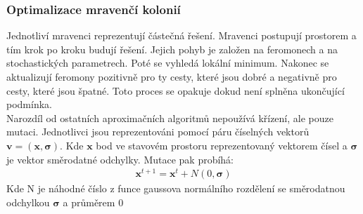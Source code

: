 \subsubsection{Optimalizace mravenčí kolonií}
Jednotliví mravenci reprezentují částečná řešení. Mravenci postupují prostorem a tím krok po kroku budují řešení. Jejich pohyb je založen na feromonech a na 
stochastických parametrech. Poté se vyhledá lokální minimum. Nakonec se aktualizují feromony pozitivně pro ty cesty, které jsou dobré a negativně pro cesty, které
jsou špatné. Toto proces se opakuje dokud není splněna ukončující podmínka.\\
Narozdíl od ostatních aproximačních algoritmů nepoužívá křízení, ale pouze mutaci. Jednotlivci jsou reprezentováni pomocí páru číselných vektorů \(\mathbf{v} =
(\mathbf{x},\boldsymbol{\sigma})\). Kde \(\mathbf{x}\) bod ve stavovém prostoru reprezentovaný vektorem čísel a \(\boldsymbol{\sigma}\) je vektor směrodatné 
odchylky. Mutace pak probíhá:\\
\begin{gather*}
    \mathbf{x}^{t+1} = \mathbf{x}^t + N(0, \boldsymbol{\sigma})
\end{gather*}
Kde N je náhodné číslo z funce gaussova normálního rozdělení se směrodatnou odchylkou \(\boldsymbol{\sigma}\) a průměrem 0